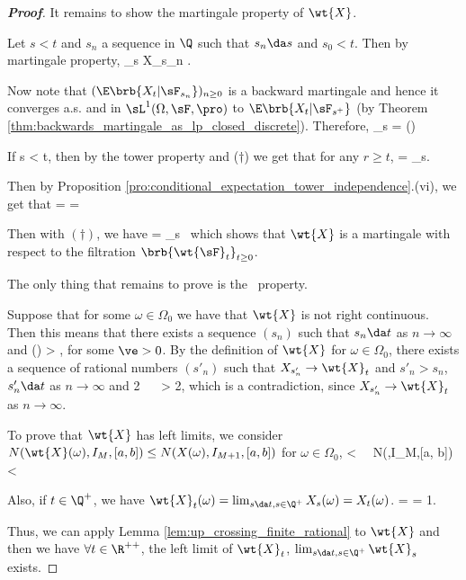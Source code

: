 \begin{proof}[\bf Proof]
It remains to show the martingale property of $\wt{X}$.

Let $s < t$ and $s_n$ a sequence in $\Q$ such that $s_n \da s$ and $s_0 < t$. Then by martingale property,
\be
{}_s  \lim X_{s_n}    \lim \E{}.
\ee

Now note that $(\E\brb{X_t|\sF_{s_n}})_{n\geq 0}$ is a backward martingale and hence it converges a.s. and in $\sL^1(\Omega,\sF,\pro)$ to $\E\brb{X_t|\sF_{s^+}}$ (by Theorem \ref{thm:backwards_martingale_as_lp_closed_discrete}). Therefore,
\be
{}_s = \E{}\quad {}\quad\quad (\dag)
\ee

If s < t, then by the tower property and ($\dag$) we get that for any $r\geq t$,
\be
\E{} = \E{}   \E {}   _s.
\ee

Then by Proposition \ref{pro:conditional_expectation_tower_independence}.(vi), we get that
\be
\E{} = \E{} = \E{} \ 
\ee

Then with $(\dag)$, we have
\be
\E{} = _s\ 
\ee
which shows that $\wt{X}$ is a martingale with respect to the filtration $\brb{\wt{\sF}_t}_{t\geq 0}$.

The only thing that remains to prove is the \cadlag\ property.

Suppose that for some $\omega \in \Omega_0$ we have that $\wt{X}$ is not right continuous. Then this means that there exists a sequence $(s_n)$ such that $s_n \da t$ as $n \to\infty$ and
\be
{}(\omega) > \ve,
\ee
for some $\ve > 0$. By the definition of $\wt{X}$ for $\omega \in \Omega_0$, there exists a sequence of rational numbers $(s'_n)$ such that $X_{s'_n} \to \wt{X}_t$ and $s'_n > s_n$, $s'_n \da t$ as $n \to \infty$ and
\be
{} \leq \frac {\ve}2 \ \ra \  > \frac {\ve}2,
\ee
which is a contradiction, since $X_{s'_n} \to \wt{X}_t$ as $n \to \infty$.

To prove that $\wt{X}$ has left limits, we consider $N(\wt{X}(\omega),I_M,[a, b]) \leq N(X(\omega),I_{M+1},[a, b])$ for $\omega \in \Omega_0$,
\be
\E{} \leq \E{} < \infty \ \ra \ N(,I_M,[a, b]) < \infty{}
\ee

Also, if $t\in \Q^+$, we have $\wt{X}_t(\omega) = \lim_{s\da t,s\in \Q^+}X_s(\omega) = X_t(\omega)$.
\be
\pro{} = \pro{} = 1.
\ee

Thus, we can apply Lemma \ref{lem:up_crossing_finite_rational} to $\wt{X}$ and then we have $\forall t\in \R^{++}$, the left limit of $\wt{X}_t$, $\lim_{s\da t,s\in \Q^+}\wt{X}_s$ exists.%
\end{proof}


